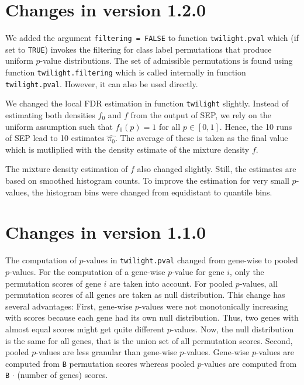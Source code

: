 \documentclass[11pt,a4paper,fleqn]{report}
\newcommand{\Rfunction}[1]{{\texttt{#1}}}
\newcommand{\Rfunarg}[1]{{\texttt{#1}}}
\begin{document}
\section*{Changes in version 1.2.0}

We added the argument \Rfunarg{filtering = FALSE} to function \Rfunction{twilight.pval} which (if set to \Rfunarg{TRUE}) invokes the filtering for class label permutations that produce uniform $p$-value distributions. The set of admissible permutations is found using function \Rfunarg{twilight.filtering} which is called internally in function \Rfunarg{twilight.pval}. However, it can also be used directly.

We changed the local FDR estimation in function \Rfunction{twilight} slightly. Instead of estimating both densities $f_0$ and $f$ from the output of SEP, we rely on the uniform assumption such that $f_0(p)=1$ for all $p \in [0,1]$. Hence, the 10 runs of SEP lead to 10 estimates $\widehat{\pi_0}$. The average of these is taken as the final value which is mutliplied with the density estimate of the mixture density $f$.

The mixture density estimation of $f$ also changed slightly. Still, the estimates are based on smoothed histogram counts. To improve the estimation for very small $p$-values, the histogram bins were changed from equidistant to quantile bins.
       
       
\section*{Changes in version 1.1.0}

The computation of $p$-values in \Rfunction{twilight.pval} changed from gene-wise to pooled $p$-values. For the computation of a gene-wise $p$-value for gene $i$, only the permutation scores of gene $i$ are taken into account. For pooled $p$-values, all permutation scores of all genes are taken as null distribution. This change has several advantages: First, gene-wise $p$-values were not monotonically increasing with scores because each gene had its own null distribution. Thus, two genes with almost equal scores might get quite different $p$-values. Now, the null distribution is the same for all genes, that is the union set of all permutation scores. Second, pooled $p$-values are less granular than gene-wise $p$-values. Gene-wise $p$-values are computed from \Rfunarg{B} permutation scores whereas pooled $p$-values are computed from \Rfunarg{B} $\cdot$ (number of genes) scores.
\end{document}
